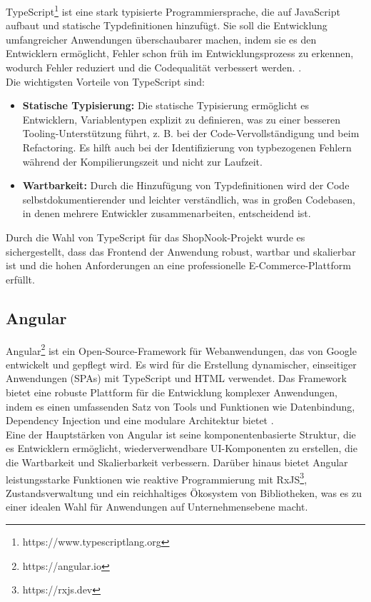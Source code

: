 TypeScript\footnote{https://www.typescriptlang.org} ist eine stark typisierte Programmiersprache, die auf JavaScript aufbaut und statische Typdefinitionen hinzufügt. Sie soll die Entwicklung umfangreicher Anwendungen überschaubarer machen, indem sie es den Entwicklern ermöglicht, Fehler schon früh im Entwicklungsprozess zu erkennen, wodurch Fehler reduziert und die Codequalität verbessert werden. \cite{Typescript:2024}.\\
Die wichtigsten Vorteile von TypeScript sind:
\begin{itemize}
	\item \textbf{Statische Typisierung:} Die statische Typisierung  ermöglicht es Entwicklern, Variablentypen explizit zu definieren, was zu einer besseren Tooling-Unterstützung führt, z. B. bei der Code-Vervollständigung und beim Refactoring. Es hilft auch bei der Identifizierung von typbezogenen Fehlern während der Kompilierungszeit und nicht zur Laufzeit.
	\item \textbf{Wartbarkeit:} Durch die Hinzufügung von Typdefinitionen wird der Code selbstdokumentierender und leichter verständlich, was in großen Codebasen, in denen mehrere Entwickler zusammenarbeiten, entscheidend ist.
\end{itemize}
Durch die Wahl von TypeScript für das ShopNook-Projekt wurde es sichergestellt, dass das Frontend der Anwendung robust, wartbar und skalierbar ist und die hohen Anforderungen an eine professionelle E-Commerce-Plattform erfüllt.

\subsection{Angular}

Angular\footnote{https://angular.io} ist ein Open-Source-Framework für Webanwendungen, das von Google entwickelt und gepflegt wird. Es wird für die Erstellung dynamischer, einseitiger Anwendungen (SPAs) mit TypeScript und HTML verwendet. Das Framework bietet eine robuste Plattform für die Entwicklung komplexer Anwendungen, indem es einen umfassenden Satz von Tools und Funktionen wie Datenbindung, Dependency Injection und eine modulare Architektur bietet \cite{Angular:2024}.\\
Eine der Hauptstärken von Angular ist seine komponentenbasierte Struktur, die es Entwicklern ermöglicht, wiederverwendbare UI-Komponenten zu erstellen, die die Wartbarkeit und Skalierbarkeit verbessern. Darüber hinaus bietet Angular leistungsstarke Funktionen wie reaktive Programmierung mit RxJS\footnote{https://rxjs.dev}, Zustandsverwaltung und ein reichhaltiges Ökosystem von Bibliotheken, was es zu einer idealen Wahl für Anwendungen auf Unternehmensebene macht.

